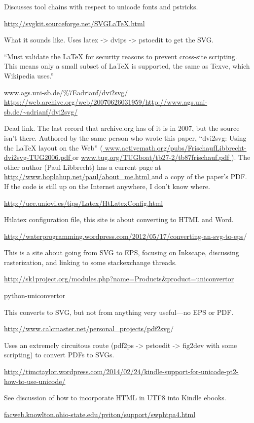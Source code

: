 \documentclass[12pt]{article}
\begin{document}
Discusses tool chains with respect to unicode fonts and pstricks.


\url{http://svgkit.sourceforge.net/SVGLaTeX.html}

What it sounds like.  Uses latex -> dvips -> pstoedit to get the SVG.

``Must validate the LaTeX for security reasons to prevent cross-site scripting. This means only a small subset of LaTeX is supported, the same as Texvc, which Wikipedia uses.''


\url{www.ags.uni-sb.de/\%7Eadrianf/dvi2svg/}
\url{https://web.archive.org/web/20070626031959/http://www.ags.uni-sb.de/~adrianf/dvi2svg/}

Dead link.  The last record that archive.org has of it is in 2007, but
the source isn't there.  Authored by the same person who wrote this
paper, ``dvi2svg: Using the LaTeX layout on the Web''
(\url{
www.activemath.org/pubs/FrischaufLibbrecht-dvi2svg-TUG2006.pdf‎
} or \url{
www.tug.org/TUGboat/tb27-2/tb87frischauf.pdf
}).  The other author (Paul
Libbrecht) has a current page at \url{
http://www.hoplahup.net/paul/about_me.html
} and a copy of the paper's PDF.  If the code is still up on the
Internet anywhere, I don't know where.


\url{http://uce.uniovi.es/tips/Latex/HtLatexConfig.html}

Htlatex configuration file, this site is about converting to HTML and Word.


\url{http://waterprogramming.wordpress.com/2012/05/17/converting-an-svg-to-eps}/

This is a site about going from SVG to EPS, focusing on Inkscape,
discussing rasterization, and linking to some stackexchange threads.


\url{http://sk1project.org/modules.php?name=Products&product=uniconvertor}

python-uniconvertor

This converts to SVG, but not from anything very useful---no EPS or
PDF.


\url{http://www.calcmaster.net/personal_projects/pdf2svg}/

Uses an extremely circuitous route (pdf2ps -> pstoedit -> fig2dev with
some scripting) to convert PDFs to SVGs.


\url{
http://timctaylor.wordpress.com/2014/02/24/kindle-support-for-unicode-pt2-how-to-use-unicode/
}

See discussion of how to incorporate HTML in UTF8 into Kindle ebooks.

\url{
facweb.knowlton.ohio-state.edu/pviton/support/swphtpa4.html‎
}
\end{document}
